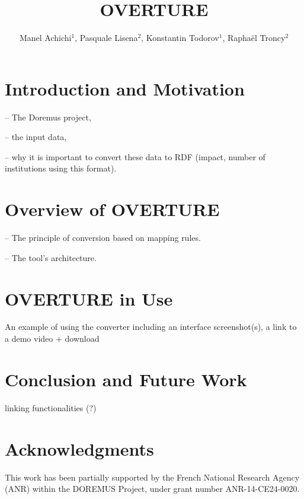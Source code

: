 \documentclass[runningheads,a4paper]{llncs}
\begin{document}
\title{OVERTURE}


\author{Manel Achichi$^1$, Pasquale Lisena$^2$, Konstantin Todorov$^1$, Rapha\"{e}l Troncy$^2$}

\maketitle


\begin{abstract}

\end{abstract}


\section{Introduction and Motivation}

-- The Doremus project,

-- the input data,

-- why it is important to convert these data to RDF (impact, number of institutions using this format).

\section{Overview of OVERTURE}

-- The principle of conversion based on mapping rules.

-- The tool's architecture.

\section{OVERTURE in Use}

An example of using the converter including an interface screenshot(s), a link to a demo video + download

\section{Conclusion and Future Work}

linking functionalities (?)

\section*{Acknowledgments}
This work has been partially supported by the French National Research Agency (ANR) within the DOREMUS Project, under grant number ANR-14-CE24-0020.



\end{document}
